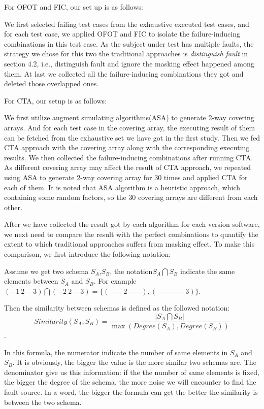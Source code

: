 \documentclass{sig-alternate}
\begin{document}
For OFOT and FIC, our set up is as follows:

We first selected failing test cases from the exhaustive executed test cases, and for each test case, we applied OFOT and FIC to isolate the failure-inducing combinations in this test case. As the subject under test has multiple faults, the strategy we chose for this two the traditional approaches is \emph{distinguish fault} in section 4.2, i.e., distinguish fault and ignore the masking effect happened among them. At last we collected all the failure-inducing combinations they got and deleted those overlapped ones.

For CTA, our setup is as follows:

We first utilize augment simulating algorithms(ASA) to generate 2-way covering arrays. And for each test case in the covering array, the executing result of them can be fetched from the exhaustive set we have got in the first study. Then we fed CTA approach with the covering array along with the corresponding executing results. We then collected the failure-inducing combinations after running CTA. As different covering array may affect the result of CTA approach, we repeated using ASA to generate 2-way covering array for 30 times and applied CTA for each of them. It is noted that ASA algorithm is a heuristic approach, which containing some random factors, so the 30 covering arrays are different from each other.

After we have collected the result got by each algorithm for each version software, we next need to compare the result with the perfect combinations to quantify the extent to which traditional approaches suffers from masking effect. To make this comparison, we first introduce the following notation:

Assume we get two schema $S_{A}$,$S_{B}$, the notation$S_{A} \bigcap S_{B}$ indicate the same elements between $S_{A}$ and $S_{B}$. For example $(- 1\ 2 - 3) \bigcap  (- 2\ 2 - 3) = \{ (- - 2 - -) , (- - - - 3)\}$.

Then the similarity between schemas is defined as the followed notation:
\begin{displaymath} Similarity(S_{A},S_{B})= \frac{|S_{A} \bigcap S_{B}|}{\max (Degree(S_{A}),Degree(S_{B})) } \end{displaymath}.

In this formula, the numerator indicate the number of same elements in  $S_{A}$ and $S_{B}$. It is obviously, the bigger the value is the more similar two schemas are.  The denominator give us this information: if the the number of same elements is fixed, the bigger the degree of the schema, the more noise we will encounter to find the fault source. In a word, the bigger the formula can get the better the similarity is between the two schema.
\end{document}
